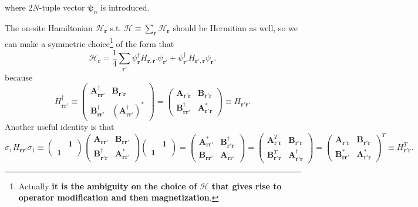 \documentclass[10pt,nofootinbib]{revtex4}
\begin{document}
		where $2N$-tuple vector $\bm{\psi}_n$ is introduced.\par
		The on-site Hamiltonian $\mathcal{H}_{\bm{r}}$ s.t. $\mathcal{H}\equiv\sum_{\bm{r}}\mathcal{H}_{\bm{r}}$ should be Hermitian as well, so we can make a symmetric choice\footnote{Actually \textbf{it is the ambiguity on the choice of $\mathcal{H}$ that gives rise to operator modification and then magnetization}.} of the form that
		\begin{equation}\label{1.1.3}
			\mathcal{H}_{\bm{r}}=\dfrac{1}{4}\sum_{\bm{r'}}\psi_{\bm{r}}^\dagger H_{\bm{r},\bm{r'}}\psi_{\bm{r'}}+\psi_{\bm{r'}}^\dagger H_{\bm{r'},\bm{r}}\psi_{\bm{r}}.
		\end{equation}
		because
		\begin{equation}\label{1.1.4}
			H_{\bm{rr'}}^\dagger\equiv \left(\begin{array}{cc}
				\bm{A}_{\bm{rr'}}^\dagger & \bm{B}_{\bm{r'r}} \\
				\bm{B}_{\bm{rr'}}^\dagger & (\bm{A}_{\bm{rr'}}^\dagger)^*
			\end{array}\right)=\left(\begin{array}{cc}
				\bm{A}_{\bm{r'r}} & \bm{B}_{\bm{r'r}}\\
				\bm{B}_{\bm{rr'}}^\dagger & \bm{A}_{\bm{r'r}}^*
			\end{array}\right)\equiv H_{\bm{r'r}}.
		\end{equation}
		Another useful identity is that
		\begin{equation}\label{1.1.5}
			\sigma_1H_{\bm{rr'}}\sigma_1\equiv \left(\begin{array}{cc}
				&\mathbf{1}\\\mathbf{1}&
			\end{array}\right)\left(\begin{array}{cc}
				\bm{A}_{\bm{rr'}}&\bm{B}_{\bm{rr'}}\\\bm{B}_{\bm{r'r}}^\dagger&\bm{A}_{\bm{rr'}}^*
			\end{array}\right)\left(\begin{array}{cc}
				&\bm{1}\\\bm{1}&
			\end{array}\right)=\left(\begin{array}{cc}
				\bm{A}_{\bm{rr'}}^*&\bm{B}_{\bm{r'r}}^\dagger\\\bm{B}_{\bm{rr'}}&\bm{A}_{\bm{rr'}}
			\end{array}\right)=\left(\begin{array}{cc}
				\bm{A}_{\bm{r'r}}^T&\bm{B}_{\bm{r'r}}\\\bm{B}_{\bm{r'r}}^T&\bm{A}_{\bm{r'r}}^\dagger
			\end{array}\right)=\left(\begin{array}{cc}
				\bm{A}_{\bm{r'r}}&\bm{B}_{\bm{r'r}}\\\bm{B}_{\bm{rr'}}^*&\bm{A}_{\bm{r'r}}^*
			\end{array}\right)^T\equiv H_{\bm{r'r}}^T.
		\end{equation}
\end{document}
